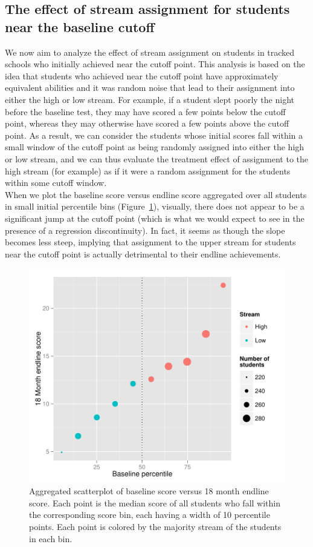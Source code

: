 \documentclass[11pt]{article}
\begin{document}
 \subsection{The effect of stream assignment for students near the baseline cutoff}
We now aim to analyze the effect of stream assignment on students in tracked schools who initially achieved near the cutoff point. This analysis is based on the idea that students who achieved near the cutoff point have approximately equivalent abilities and it was random noise that lead to their assignment into either the high or low stream. For example, if a student slept poorly the night before the baseline test, they may have scored a few points below the cutoff point, whereas they may otherwise have scored a few points above the cutoff point. As a result, we can consider the students whose initial scores fall within a small window of the cutoff point as being randomly assigned into either the high or low stream, and we can thus evaluate the treatment effect of assignment to the high stream (for example) as if it were a random assignment for the students within some cutoff window.\\
When we plot the baseline score versus endline score aggregated over all students in small initial percentile bins (Figure~\ref{fig:RD_big}), visually, there does not appear to be a significant jump at the cutoff point (which is what we would expect to see in the presence of a regression discontinuity). In fact, it seems as though the slope becomes less steep, implying that assignment to the upper stream for students near the cutoff point is actually detrimental to their endline achievements.
  \begin{figure}[H]
 \centering
 \includegraphics[scale=0.7]{RD_initial.pdf}
 \caption{Aggregated scatterplot of baseline score versus 18 month endline score. Each point is the median score of all students who fall within the corresponding score bin, each having a width of 10 percentile points. Each point is colored by the majority stream of the students in each bin.}
 \label{fig:RD_big}
 \end{figure}
 
\end{document}
